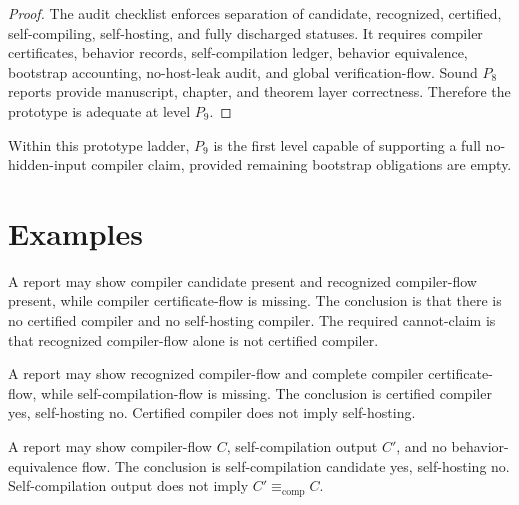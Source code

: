 \begin{proof}
The audit checklist enforces separation of candidate, recognized, certified, self-compiling, self-hosting, and fully discharged statuses. It requires compiler certificates, behavior records, self-compilation ledger, behavior equivalence, bootstrap accounting, no-host-leak audit, and global verification-flow. Sound $P_8$ reports provide manuscript, chapter, and theorem layer correctness. Therefore the prototype is adequate at level $P_9$.
\end{proof}

\begin{corollary}
\label{cor:self-hosting-p9-top-adequacy}
Within this prototype ladder, $P_9$ is the first level capable of supporting a full no-hidden-input compiler claim, provided remaining bootstrap obligations are empty.
\end{corollary}

\section{Examples}
\label{sec:self-hosting-examples}

\begin{example}
\label{ex:self-hosting-compiler-without-cert}
A report may show compiler candidate present and recognized compiler-flow present, while compiler certificate-flow is missing. The conclusion is that there is no certified compiler and no self-hosting compiler. The required cannot-claim is that recognized compiler-flow alone is not certified compiler.
\end{example}

\begin{example}
\label{ex:self-hosting-certified-without-self-compilation}
A report may show recognized compiler-flow and complete compiler certificate-flow, while self-compilation-flow is missing. The conclusion is certified compiler yes, self-hosting no. Certified compiler does not imply self-hosting.
\end{example}

\begin{example}
\label{ex:self-hosting-without-behavior-equivalence}
A report may show compiler-flow $C$, self-compilation output $C'$, and no behavior-equivalence flow. The conclusion is self-compilation candidate yes, self-hosting no. Self-compilation output does not imply $C'\equiv_{\mathrm{comp}}C$.
\end{example}

